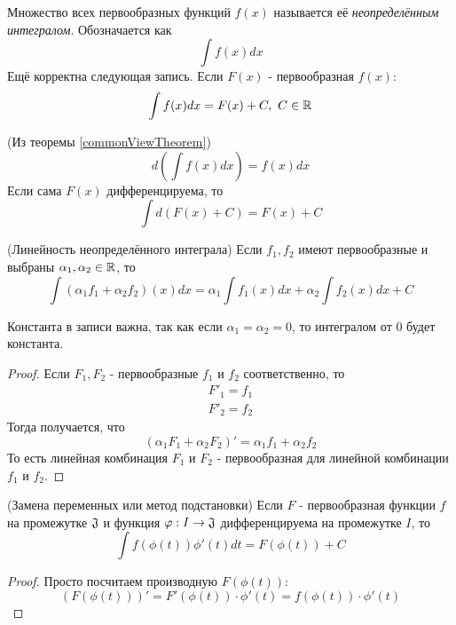 \begin{definition}
	Множество всех первообразных функций $f(x)$ называется её \textit{неопределённым интегралом}. Обозначается как
	\[
		\int f(x)dx
	\]
	Ещё корректна следующая запись. Если $F(x)$ - первообразная $f(x)$:
	\[
	 	\int f(x)dx = F(x) + C,\ C \in \mathbb{R}
	\]
\end{definition}

\begin{corollary} (Из теоремы \ref{commonViewTheorem})
	\[
		d\left(\int f(x)dx\right) = f(x)dx
	\]
	Если сама $F(x)$ дифференцируема, то
	\[
		\int d\left(F(x) + C\right) = F(x) + C
	\]
\end{corollary}

\begin{theorem} (Линейность неопределённого интеграла)
	Если $f_1, f_2$ имеют первообразные и выбраны $\alpha_1, \alpha_2 \in \mathbb{R}$, то
	\[
		\int(\alpha_1 f_1 + \alpha_2 f_2)(x)dx = \alpha_1\int f_1(x)dx + \alpha_2 \int f_2(x)dx + C
	\]
\end{theorem}

\begin{note}
	Константа в записи важна, так как если $\alpha_1 = \alpha_2 = 0$, то интегралом от 0 будет константа.
\end{note}

\begin{proof}
	Если $F_1, F_2$ - первообразные $f_1$ и $f_2$ соответственно, то
	\begin{align*}
		F'_1 = f_1
		\\
		F'_2 = f_2
	\end{align*}
	Тогда получается, что
	\[
		\left(\alpha_1 F_1 + \alpha_2 F_2\right)' = \alpha_1 f_1 + \alpha_2 f_2
	\]
	То есть линейная комбинация $F_1$ и $F_2$ - первообразная для линейной комбинации $f_1$ и $f_2$.
\end{proof}

\begin{theorem} (Замена переменных или метод подстановки)
	Если $F$ - первообразная функции $f$ на промежутке $\mathfrak{J}$ и функция $\varphi: I \to \mathfrak{J}$ дифференцируема на промежутке $I$, то
	\[
		\int f(\phi(t))\phi'(t)dt = F(\phi(t)) + C
	\]
\end{theorem}

\begin{proof}
	Просто посчитаем производную $F(\phi(t))$:
	\[
		\left(F(\phi(t))\right)' = F'(\phi(t)) \cdot \phi'(t) = f(\phi(t)) \cdot \phi'(t)
	\]
\end{proof}

